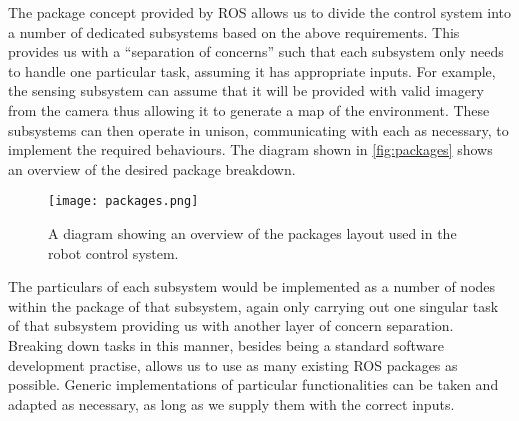 The package concept provided by ROS allows us to divide the control system into a number of dedicated subsystems based on the above requirements. This provides us with a ``separation of concerns'' such that each subsystem only needs to handle one particular task, assuming it has appropriate inputs. For example, the sensing subsystem can assume that it will be provided with valid imagery from the camera thus allowing it to generate a map of the environment. These subsystems can then operate in unison, communicating with each as necessary, to implement the required behaviours. The diagram shown in \autoref{fig:packages} shows an overview of the desired package breakdown. 

\begin{figure}[h!]
    \centering
    \texttt{[image: packages.png]}
    \caption{A diagram showing an overview of the packages layout used in the robot control system.}
    \label{fig:packages}
\end{figure}

The particulars of each subsystem would be implemented as a number of nodes within the package of that subsystem, again only carrying out one singular task of that subsystem providing us with another layer of concern separation. Breaking down tasks in this manner, besides being a standard software development practise, allows us to use as many existing ROS packages as possible. Generic implementations of particular functionalities can be taken and adapted as necessary, as long as we supply them with the correct inputs.
